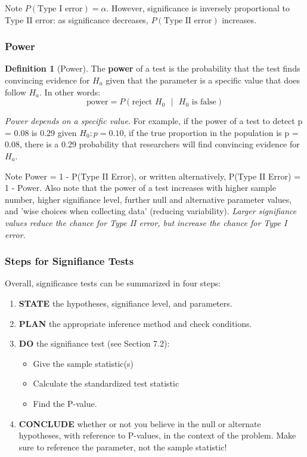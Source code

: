 \documentclass[12pt, a4paper]{article}
\theoremstyle{definition}
\newtheorem{definition}{Definition}
\begin{document}
Note $P(\textrm{Type I error}) = \alpha$.
However, significance is inversely proportional to Type II error: as significance decreases, $P(\textrm{Type II error})$ increases.

\subsubsection{Power}
\begin{definition}[Power]
    The \textbf{power} of a test is the probability that the test finds convincing evidence for $H_a$ given that the parameter is a specific value that does follow $H_a$. In other words:
    \[\textrm{power} = P(\textrm{reject $H_0$ $|$ $H_0$ is false})\]
\end{definition}

\textit{Power depends on a specific value.} For example, if the power of a test to detect p = 0.08 is 0.29 given $H_0: p = 0.10$, if the true proportion in the population is p = 0.08, there is a 0.29 probability that researchers will find convincing evidence for $H_a$.

Note Power = 1 - P(Type II Error), or written alternatively, P(Type II Error) = 1 - Power. Also note that the power of a test increases with higher sample number, higher signifiance level, further null and alternative parameter values, and 'wise choices when collecting data' (reducing variability).
\textit{Larger signifiance values reduce the chance for Type II error, but increase the chance for Type I error.}

\subsubsection{Steps for Signifiance Tests}
Overall, significance tests can be summarized in four steps:
\begin{enumerate}
    \item \textbf{STATE} the hypotheses, signifiance level, and parameters.
    \item \textbf{PLAN} the appropriate inference method and check conditions.
    \item \textbf{DO} the signifiance test (see Section 7.2): \begin{itemize}
        \item Give the sample statistic(s)
        \item Calculate the standardized test statistic
        \item Find the P-value.
    \end{itemize}
    \item \textbf{CONCLUDE} whether or not you believe in the null or alternate hypotheses, with reference to P-values, in the context of the problem. Make sure to reference the parameter, not the sample statistic!
\end{enumerate}
\end{document}
